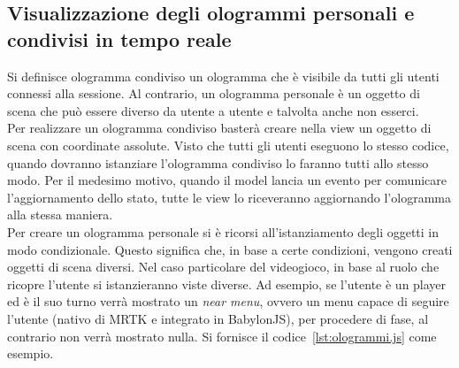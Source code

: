 \subsection{Visualizzazione degli ologrammi personali e condivisi in tempo reale}
Si definisce ologramma condiviso un ologramma che è visibile da tutti gli utenti connessi alla sessione. Al contrario, un ologramma personale è un oggetto di scena che può essere diverso
da utente a utente e talvolta anche non esserci.\\
Per realizzare un ologramma condiviso basterà creare nella view un oggetto di scena con coordinate assolute. Visto che tutti gli utenti eseguono lo stesso codice, quando
dovranno istanziare l'ologramma condiviso lo faranno tutti allo stesso modo. Per il medesimo motivo, quando il model lancia un evento per comunicare l'aggiornamento dello stato, tutte le 
view lo riceveranno aggiornando l'ologramma alla stessa maniera.\\
Per creare un ologramma personale si è ricorsi all'istanziamento degli oggetti in modo condizionale. Questo significa che, in base a certe condizioni, vengono creati oggetti di scena 
diversi. Nel caso particolare del videogioco, in base al ruolo che ricopre l'utente si istanzieranno viste diverse. Ad esempio, se l'utente è un player ed è il suo turno verrà mostrato un
\textit{near menu}, ovvero un menu capace di seguire l'utente (nativo di MRTK e integrato in BabylonJS), per procedere di fase, al contrario non verrà mostrato nulla. Si fornisce il 
codice~\ref{lst:ologrammi.js} come esempio. 

